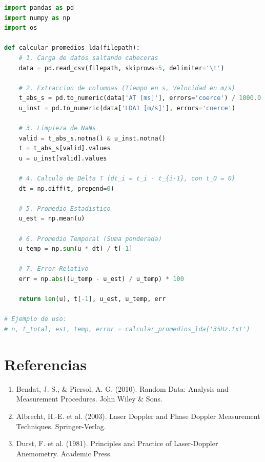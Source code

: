 \documentclass[11pt, a4paper]{article}
\begin{document}
\begin{lstlisting}[language=Python]
import pandas as pd
import numpy as np
import os

def calcular_promedios_lda(filepath):
    # 1. Carga de datos saltando cabeceras
    data = pd.read_csv(filepath, skiprows=5, delimiter='\t')
    
    # 2. Extraccion de columnas (Tiempo en s, Velocidad en m/s)
    t_abs_s = pd.to_numeric(data['AT [ms]'], errors='coerce') / 1000.0
    u_inst = pd.to_numeric(data['LDA1 [m/s]'], errors='coerce')
    
    # 3. Limpieza de NaNs
    valid = t_abs_s.notna() & u_inst.notna()
    t = t_abs_s[valid].values
    u = u_inst[valid].values
    
    # 4. Calculo de Delta T (dt_i = t_i - t_{i-1}, con t_0 = 0)
    dt = np.diff(t, prepend=0)
    
    # 5. Promedio Estadistico
    u_est = np.mean(u)
    
    # 6. Promedio Temporal (Suma ponderada)
    u_temp = np.sum(u * dt) / t[-1]
    
    # 7. Error Relativo
    err = np.abs((u_temp - u_est) / u_temp) * 100
    
    return len(u), t[-1], u_est, u_temp, err

# Ejemplo de uso:
# n, t_total, est, temp, error = calcular_promedios_lda('35Hz.txt')
\end{lstlisting}

\section{Referencias}
\begin{enumerate}
    \item Bendat, J. S., \& Piersol, A. G. (2010). Random Data: Analysis and Measurement Procedures. John Wiley \& Sons.
    \item Albrecht, H.-E. et al. (2003). Laser Doppler and Phase Doppler Measurement Techniques. Springer-Verlag.
    \item Durst, F. et al. (1981). Principles and Practice of Laser-Doppler Anemometry. Academic Press.
\end{enumerate}
\end{document}
